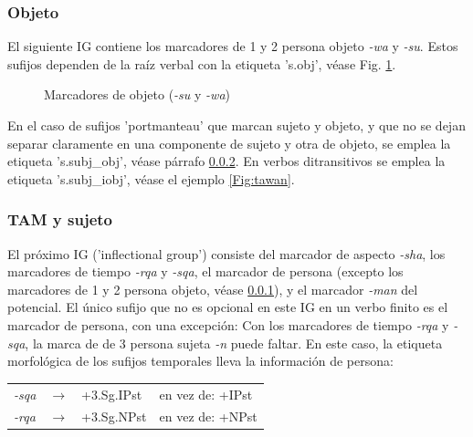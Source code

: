 \documentclass[a4paper,11pt,DIV12]{scrartcl}
\begin{document}
\subsubsection{Objeto}\label{Sec:objeto}
El siguiente IG contiene los marcadores de 1{\textordfeminine} y 2{\textordfeminine} persona objeto {\em -wa} y {\em -su}. Estos sufijos dependen de la ra\'iz verbal con la etiqueta 's.obj', v\'ease Fig. \ref{Fig:su_wa}.
% 
\begin{figure}
\begin{center}
 \caption{Marcadores de objeto ({\em -su} y {\em -wa})}\label{Fig:su_wa}
\end{center}
\end{figure}


En el caso de sufijos 'portmanteau' que marcan sujeto y objeto, y que no se dejan separar claramente en una componente de sujeto y otra de objeto, se emplea la etiqueta 's.subj\_obj', v\'ease p\'arrafo \ref{Sec:TAM}.
En verbos ditransitivos se emplea la etiqueta 's.subj\_iobj', v\'ease el ejemplo \ref{Fig:tawan}.

  \subsubsection{TAM y sujeto}\label{Sec:TAM}
El pr\'oximo IG ('inflectional group') consiste del marcador de aspecto {\em -sha}, los marcadores de tiempo {\em -rqa} y {\em -sqa}, el marcador de persona (excepto los marcadores de 1{\textordfeminine} y 2{\textordfeminine} persona objeto, v\'ease \ref{Sec:objeto}), y el marcador {\em -man} del potencial.
El \'unico sufijo que no es opcional en este IG en un verbo finito es el marcador de persona, con una excepci\'on: Con los marcadores de tiempo {\em -rqa} y {\em -sqa}, la marca de de 3{\textordfeminine} persona sujeta {\em -n} puede faltar. En este caso, la etiqueta morfol\'ogica de los sufijos temporales lleva la informaci\'on de persona:
\begin{center}
\begin{tabular}{llll}
\toprule
{\em-sqa} & $\rightarrow$ & +3.Sg.IPst & en vez de: +IPst\\
{\em-rqa} & $\rightarrow$ & +3.Sg.NPst  & en vez de: +NPst\\
\bottomrule
\end{tabular}
\end{center}
\end{document}

